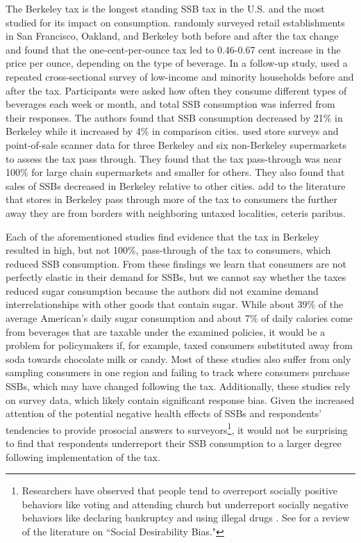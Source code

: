 \documentclass[12pt]{article}
\begin{document}
The Berkeley tax is the longest standing SSB tax in the U.S. and the most studied for its impact on consumption. \textcite{falbe2015higher} randomly surveyed retail establishments in San Francisco, Oakland, and Berkeley both before and after the tax change and found that the one-cent-per-ounce tax led to 0.46-0.67 cent increase in the price per ounce, depending on the type of beverage. In a follow-up study, \textcite{falbe2016impact} used a repeated cross-sectional survey of low-income and minority households before and after the tax. Participants were asked how often they consume different types of beverages each week or month, and total SSB consumption was inferred from their responses. The authors found that SSB consumption decreased by 21\% in Berkeley while it increased by 4\% in comparison cities. \textcite{silver2017changes} used store surveys and point-of-sale scanner data for three Berkeley and six non-Berkeley supermarkets to assess the tax pass through. They found that the tax pass-through was near 100\% for large chain supermarkets and smaller for others. They also found that sales of SSBs decreased in Berkeley relative to other cities. \textcite{cawley2017berkeley} add to the literature that stores in Berkeley pass through more of the tax to consumers the further away they are from borders with neighboring untaxed localities, ceteris paribus.

Each of the aforementioned studies find evidence that the tax in Berkeley resulted in high, but not 100\%, pass-through of the tax to consumers, which reduced SSB consumption. From these findings we learn that consumers are not perfectly elastic in their demand for SSBs, but we cannot say whether the taxes reduced sugar consumption because the authors did not examine demand interrelationships with other goods that contain sugar. While about 39\% of the average American's daily sugar consumption \parencite{dietary2015dietary} and about 7\% of daily calories \parencite{allcott2019should} come from beverages that are taxable under the examined policies, it would be a problem for policymakers if, for example, taxed consumers substituted away from soda towards chocolate milk or candy. Most of these studies also suffer from only sampling consumers in one region and failing to track where consumers purchase SSBs, which may have changed following the tax. Additionally, these studies rely on survey data, which likely contain significant response bias. Given the increased attention of the potential negative health effects of SSBs and respondents' tendencies to provide prosocial answers to surveyors\footnote{Researchers have observed that people tend to overreport socially positive behaviors like voting \parencite{silver1986overreports} and attending church \parencite{hadaway1993polls} but underreport socially negative behaviors like declaring bankruptcy \parencite{locander1976investigation} and using illegal drugs \parencite{mensch1988underreporting}. See \textcite{krumpal2013determinants} for a review of the literature on ``Social Desirability Bias."}, it would not be surprising to find that respondents underreport their SSB consumption to a larger degree following implementation of the tax.
\end{document}

